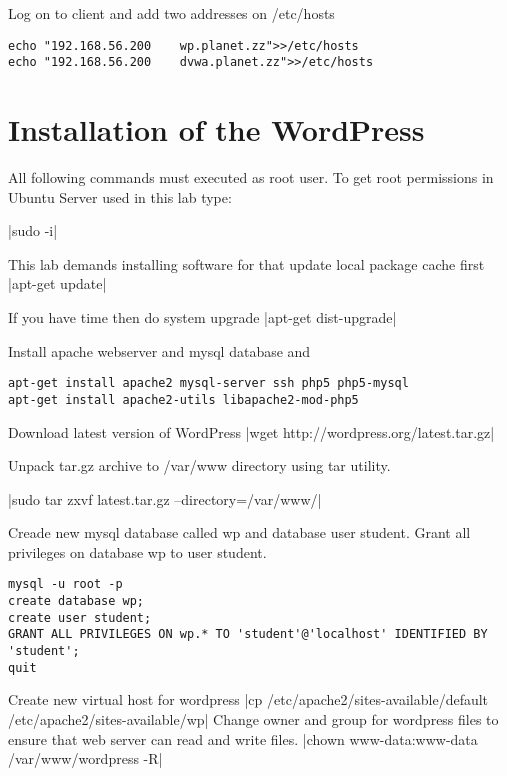 Log on to client and add two addresses on /etc/hosts
\begin{verbatim}
echo "192.168.56.200	wp.planet.zz">>/etc/hosts
echo "192.168.56.200	dvwa.planet.zz">>/etc/hosts
\end{verbatim}

\section{Installation of the WordPress}
All following commands must executed as root user. To get root permissions in Ubuntu Server used in this lab type:

|sudo -i|


This lab demands installing software for that update local package cache first
|apt-get update|

If you have time then do system upgrade
|apt-get dist-upgrade|

Install apache webserver and mysql database and 
\begin{verbatim}
apt-get install apache2 mysql-server ssh php5 php5-mysql 
apt-get install apache2-utils libapache2-mod-php5
\end{verbatim}

Download latest version of WordPress
|wget http://wordpress.org/latest.tar.gz|

Unpack tar.gz archive to  /var/www directory using tar utility.

|sudo tar zxvf latest.tar.gz --directory=/var/www/|

Creade new mysql database called wp and database user student. Grant all privileges on database wp to user student.

\begin{verbatim}
mysql -u root -p
create database wp;
create user student;
GRANT ALL PRIVILEGES ON wp.* TO 'student'@'localhost' IDENTIFIED BY 'student';
quit
\end{verbatim}

Create new virtual host for wordpress 
|cp /etc/apache2/sites-available/default /etc/apache2/sites-available/wp|
Change owner and group for wordpress files to ensure that web server can read and write files.
|chown www-data:www-data /var/www/wordpress -R|

